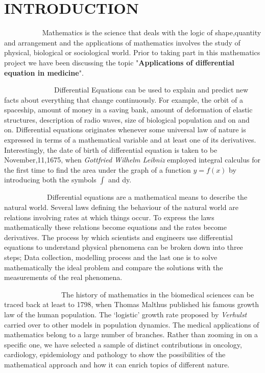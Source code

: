 \chapter*{\textbf{INTRODUCTION}}
\thispagestyle{empty}



\par~~~~~~~~~~ Mathematics is the science that deals with the logic of shape,quantity and arrangement and the applications of mathematics involves the study of physical, biological or sociological world. Prior to taking part in this mathematics project we have been discussing the topic "\textbf{Applications of differential equation in medicine}".

\par ~~~~~~~~~~~~~~Differential Equations can be used to explain and predict new facts about everything that change continuously. For example, the orbit of a spaceship, amount of money in a saving bank, amount of deformation of elastic structures, description of radio waves, size of biological population and on and on.  Differential equations originates whenever some universal law of nature is expressed in terms of a mathematical variable and at least one of its derivatives. Interestingly, the date of birth of differential equation is taken to be November,11,1675, when \textit{Gottfried Wilhelm Leibniz} employed integral calculus for the first time to find the area under the graph of a function  $y=f(x)$  by introducing both the symbols $\int$ and dy.
 
\par ~~~~~~~~~~~~Differential equations are a mathematical means to describe the natural world. Several laws defining the behaviour of the natural world are relations involving rates at which things occur. To express the laws mathematically these relations become equations and the rates become derivatives. The process by which scientists and engineers use differential equations to understand physical phenomena can be broken down into three steps; Data collection, modelling process and the last one is to solve mathematically the ideal problem and compare the solutions with the measurements of the real phenomena.

\par ~~~~~~~~~~~~~~~~The history of mathematics in the biomedical sciences can be traced back at least to 1798, when Thomas Malthus published his famous growth law of the human population. The ‘logistic’ growth rate proposed by \textit{Verhulst} carried over to other models in population dynamics. The medical applications of mathematics belong to a large number of branches. Rather than zooming in on a specific one, we have selected a sample of distinct contributions in oncology, cardiology, epidemiology and pathology to show the possibilities of the mathematical approach and how it can enrich topics of different nature.

